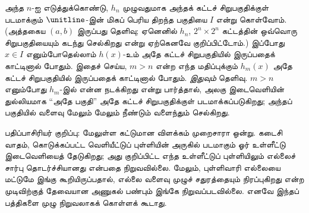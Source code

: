 \documentclass[../../../include/open-logic-section]{subfiles}
\begin{document}
அந்த $n$-ஐ எடுத்துக்கொண்டு, $h_n$ முழுவதுமாக
அந்தக் கட்டச் சிறுபகுதிக்குள் படமாக்கும்
$\unitline$-இன் மிகப் பெரிய திறந்த
பகுதியை $I$ என்று கொள்வோம். (அத்தகைய
$(a,b)$ இருப்பது தெளிவு; ஏனெனில் $h_n$,
$2^n\times 2^n$ கட்டத்தின் ஒவ்வொரு
சிறுபகுதியையும் கடந்து செல்கிறது என்று
ஏற்கெனவே குறிப்பிட்டோம்.) இப்போது
$x \in I$ எனும்போதெல்லாம் $h(x)$-உம்
அதே கட்டச் சிறுபகுதியில் இருப்பதைக்
காட்டினால் போதும். இதைச் செய்ய,
$m > n$ என்ற எந்த மதிப்புக்கும்
$h_m(x)$ அதே கட்டச் சிறுபகுதியில்
இருப்பதைக் காட்டினால் போதும். \emph{இதுவும்}
தெளிவு. $m > n$ எனும்போது $h_m$-இல்
என்ன நடக்கிறது என்று பார்த்தால்,
அலகு இடைவெளியின் துல்லியமாக “அதே பகுதி”
அதே கட்டச் சிறுபகுதிக்குள் படமாக்கப்படுகிறது;
அந்தப் பகுதியில் வளைவு மேலும் மேலும்
நீண்டும் வளைந்தும் செல்கிறது.

பதிப்பாசிரியர் குறிப்பு: மேலுள்ள கட்டுமான விளக்கம்
முறைசாரா ஒன்று. கடைசி வாதம், கொடுக்கப்பட்ட
வெளியீட்டுப் புள்ளியின் அருகில் படமாகும்
ஓர் உள்ளீட்டு இடைவெளியைத் தேடுகிறது; அது
குறிப்பிட்ட எந்த உள்ளீட்டுப் புள்ளியிலும்
எல்லைச் சார்பு தொடர்ச்சியானது என்பதை நிறுவவில்லை.
மேலும், புள்ளிவாரி எல்லையை மட்டுமே
இங்கு கூறியிருப்பதால், எல்லை வளைவு
முழுச் சதுரத்தையும் நிரப்புகிறது என்ற
முடிவிற்குத் தேவையான அணுகல் பண்பும்
இங்கே நிறுவப்படவில்லை. எனவே இந்தப்
பத்திகளை முழு நிறுவலாகக் கொள்ளக் கூடாது.
\end{document}
